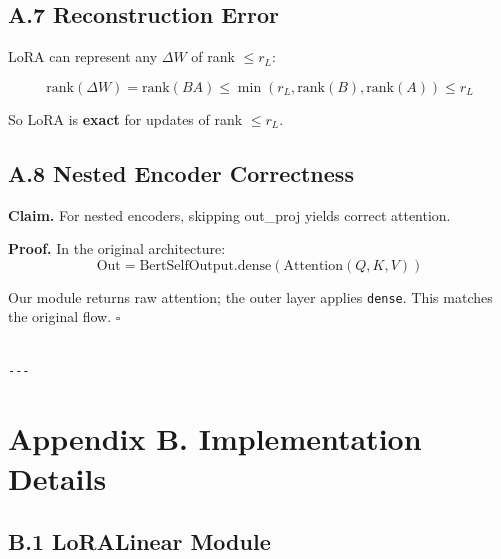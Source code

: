 \subsection{A.7 Reconstruction Error}

LoRA can represent any $\Delta W$ of rank $\leq r_L$:

\[
\text{rank}(\Delta W) = \text{rank}(BA) \leq \min(r_L, \text{rank}(B), \text{rank}(A)) \leq r_L
\tag{A.9}
\]

So LoRA is \textbf{exact} for updates of rank $\leq r_L$.

\subsection{A.8 Nested Encoder Correctness}

\textbf{Claim.} For nested encoders, skipping out\_proj yields correct attention.

\textbf{Proof.} In the original architecture:
\[
\text{Out} = \text{BertSelfOutput.dense}(\text{Attention}(Q, K, V))
\tag{A.10}
\]

Our module returns raw attention; the outer layer applies \texttt{dense}. This 
matches the original flow. $\square$
\begin{lstlisting}

---
\end{lstlisting}

\section{Appendix B. Implementation Details}

\subsection{B.1 LoRALinear Module}

